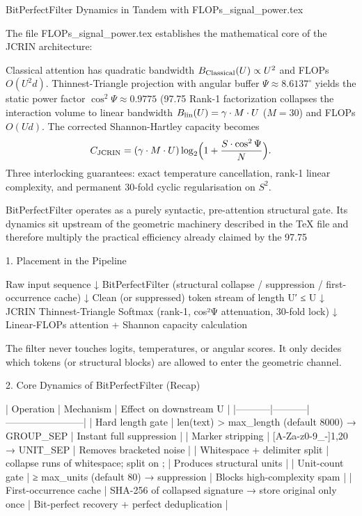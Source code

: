 BitPerfectFilter Dynamics in Tandem with FLOPs_signal_power.tex

The file FLOPs_signal_power.tex establishes the mathematical core of the JCRIN architecture:

Classical attention has quadratic bandwidth \( B_{\rm Classical}(U) \propto U^2 \) and FLOPs \( O(U^2 d) \).
Thinnest-Triangle projection with angular buffer \( \Psi \approx 8.6137^\circ \) yields the static power factor \( \cos^2\Psi \approx 0.9775 \) (97.75 %
Rank-1 factorization collapses the interaction volume to linear bandwidth \( B_{\rm lin}(U) = \gamma \cdot M \cdot U \) (\( M=30 \)) and FLOPs \( O(U d) \).
The corrected Shannon-Hartley capacity becomes  
  \[
  C_{\rm JCRIN} = (\gamma \cdot M \cdot U) \log_2\Bigl(1 + \frac{S\cdot\cos^2\Psi}{N}\Bigr).
  \]
Three interlocking guarantees: exact temperature cancellation, rank-1 linear complexity, and permanent 30-fold cyclic regularisation on \( S^2 \).

BitPerfectFilter operates as a purely syntactic, pre-attention structural gate. Its dynamics sit upstream of the geometric machinery described in the TeX file and therefore multiply the practical efficiency already claimed by the 97.75 %

1. Placement in the Pipeline

Raw input sequence
        ↓
BitPerfectFilter  (structural collapse / suppression / first-occurrence cache)
        ↓
Clean (or suppressed) token stream of length U′ ≤ U
        ↓
JCRIN Thinnest-Triangle Softmax  (rank-1, cos²Ψ attenuation, 30-fold lock)
        ↓
Linear-FLOPs attention + Shannon capacity calculation

The filter never touches logits, temperatures, or angular scores. It only decides which tokens (or structural blocks) are allowed to enter the geometric channel.

2. Core Dynamics of BitPerfectFilter (Recap)

| Operation | Mechanism | Effect on downstream U |
|-----------|-----------|------------------------|
| Hard length gate | len(text) > max_length (default 8000) → GROUP_SEP | Instant full suppression |
| Marker stripping | [A-Za-z0-9_-]{1,20} → UNIT_SEP | Removes bracketed noise |
| Whitespace + delimiter split | collapse runs of whitespace; split on { } ; \n | Produces structural units |
| Unit-count gate | ≥ max_units (default 80) → suppression | Blocks high-complexity spam |
| First-occurrence cache | SHA-256 of collapsed signature → store original only once | Bit-perfect recovery + perfect deduplication |

